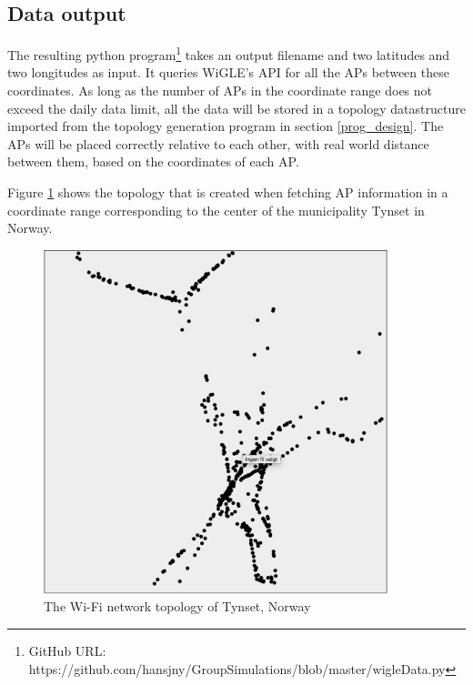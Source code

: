 \subsection{Data output}
The resulting python program\footnote{GitHub URL: https://github.com/hansjny/GroupSimulations/blob/master/wigleData.py} takes an output filename and two latitudes and two longitudes as input.
It queries WiGLE's API for all the APs between these coordinates. As long as the number of APs in the coordinate range does not exceed the daily data limit, all the data will be stored in a topology datastructure imported 
from the topology generation program in section \ref{prog_design}. The APs will be placed correctly relative to each other, with real world distance between them,
based on the coordinates of each AP. 

Figure \ref{fig:tynset_topo} shows the topology that is created when fetching AP information in a coordinate range corresponding to the center of the municipality Tynset in Norway. 

\begin{figure}
	\centering
		\includegraphics[width=10cm]{Images/tynset_topo.png}
		\caption{The Wi-Fi network topology of Tynset, Norway}%
		\label{fig:tynset_topo}%
\end{figure}


